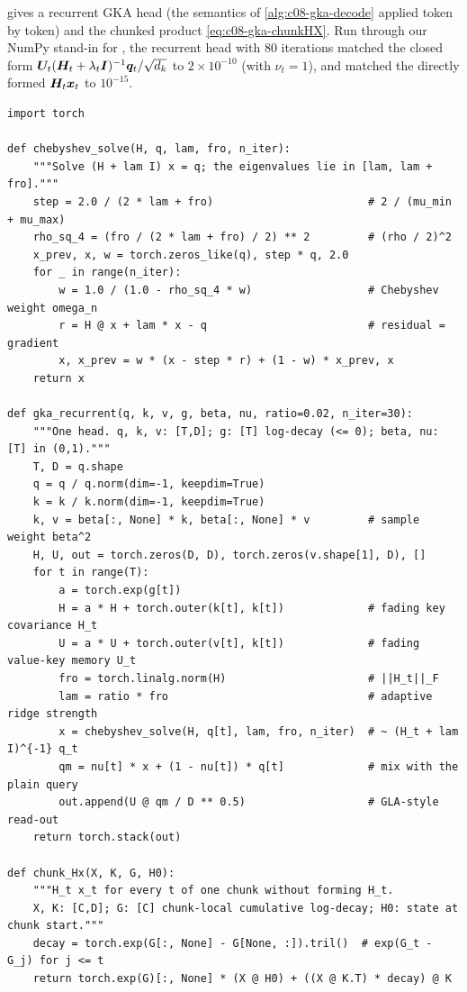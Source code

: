  gives a recurrent GKA head (the semantics of \cref{alg:c08-gka-decode}
applied token by token) and the chunked product \eqref{eq:c08-gka-chunkHX}. Run through our NumPy
stand-in for , the recurrent head with 80 iterations matched the closed form
$\bm{U}_t(\bm{H}_t+\lambda_t\bm{I})^{-1}\bm{q}_t/\sqrt{d_k}$ to $2\times10^{-10}$ (with $\nu_t=1$), and
 matched the directly formed $\bm{H}_t\bm{x}_t$ to $10^{-15}$.

\begin{lstlisting}[caption={Reference implementation (ours): a recurrent GKA head and the chunked product.},label={lst:c08-gka-ours}]
import torch

def chebyshev_solve(H, q, lam, fro, n_iter):
    """Solve (H + lam I) x = q; the eigenvalues lie in [lam, lam + fro]."""
    step = 2.0 / (2 * lam + fro)                        # 2 / (mu_min + mu_max)
    rho_sq_4 = (fro / (2 * lam + fro) / 2) ** 2         # (rho / 2)^2
    x_prev, x, w = torch.zeros_like(q), step * q, 2.0
    for _ in range(n_iter):
        w = 1.0 / (1.0 - rho_sq_4 * w)                  # Chebyshev weight omega_n
        r = H @ x + lam * x - q                         # residual = gradient
        x, x_prev = w * (x - step * r) + (1 - w) * x_prev, x
    return x

def gka_recurrent(q, k, v, g, beta, nu, ratio=0.02, n_iter=30):
    """One head. q, k, v: [T,D]; g: [T] log-decay (<= 0); beta, nu: [T] in (0,1)."""
    T, D = q.shape
    q = q / q.norm(dim=-1, keepdim=True)
    k = k / k.norm(dim=-1, keepdim=True)
    k, v = beta[:, None] * k, beta[:, None] * v         # sample weight beta^2
    H, U, out = torch.zeros(D, D), torch.zeros(v.shape[1], D), []
    for t in range(T):
        a = torch.exp(g[t])
        H = a * H + torch.outer(k[t], k[t])             # fading key covariance H_t
        U = a * U + torch.outer(v[t], k[t])             # fading value-key memory U_t
        fro = torch.linalg.norm(H)                      # ||H_t||_F
        lam = ratio * fro                               # adaptive ridge strength
        x = chebyshev_solve(H, q[t], lam, fro, n_iter)  # ~ (H_t + lam I)^{-1} q_t
        qm = nu[t] * x + (1 - nu[t]) * q[t]             # mix with the plain query
        out.append(U @ qm / D ** 0.5)                   # GLA-style read-out
    return torch.stack(out)

def chunk_Hx(X, K, G, H0):
    """H_t x_t for every t of one chunk without forming H_t.
    X, K: [C,D]; G: [C] chunk-local cumulative log-decay; H0: state at chunk start."""
    decay = torch.exp(G[:, None] - G[None, :]).tril()  # exp(G_t - G_j) for j <= t
    return torch.exp(G)[:, None] * (X @ H0) + ((X @ K.T) * decay) @ K
\end{lstlisting}

